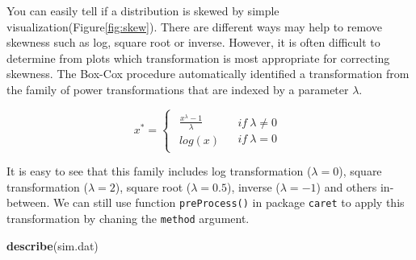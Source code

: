 \documentclass[12pt,]{krantz}
\newenvironment{Shaded}{\begin{snugshade}}{\end{snugshade}}
\newcommand{\KeywordTok}[1]{\textcolor[rgb]{0.13,0.29,0.53}{\textbf{#1}}}
\newcommand{\NormalTok}[1]{#1}
\theoremstyle{definition}
\theoremstyle{definition}
\theoremstyle{definition}
\theoremstyle{remark}
\begin{document}
You can easily tell if a distribution is skewed by simple
visualization(Figure\ref{fig:skew}). There are different ways may help
to remove skewness such as log, square root or inverse. However, it is
often difficult to determine from plots which transformation is most
appropriate for correcting skewness. The Box-Cox procedure automatically
identified a transformation from the family of power transformations
that are indexed by a parameter \(\lambda\)\citep{BOXCOX1}.

\[
x^{*}=\begin{cases}
\begin{array}{c}
\frac{x^{\lambda}-1}{\lambda}\\
log(x)
\end{array} & \begin{array}{c}
if\ \lambda\neq0\\
if\ \lambda=0
\end{array}\end{cases}
\]

It is easy to see that this family includes log transformation
(\(\lambda=0\)), square transformation (\(\lambda=2\)), square root
(\(\lambda=0.5\)), inverse (\(\lambda=-1\)) and others in-between. We
can still use function \texttt{preProcess()} in package \texttt{caret}
to apply this transformation by chaning the \texttt{method} argument.

\begin{Shaded}
\begin{Highlighting}[]
\KeywordTok{describe}\NormalTok{(sim.dat)}
\end{Highlighting}
\end{Shaded}
\end{document}
